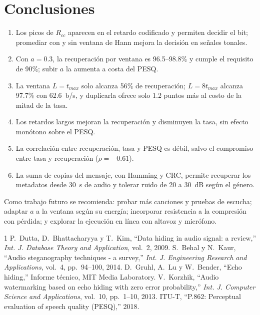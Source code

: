 \documentclass[journal]{IEEEtran}
\begin{document}
\section{Conclusiones}
\begin{enumerate}
\item Los picos de $R_{cc}$ aparecen en el retardo codificado y permiten decidir el bit; promediar con y sin ventana de Hann mejora la decisión en señales tonales.
\item Con $a=0.3$, la recuperación por ventana es 96.5--98.8\% y cumple el requisito de 90\%; subir $a$ la aumenta a costa del PESQ.
\item La ventana $L=t_{max}$ solo alcanza 56\% de recuperación; $L=8t_{max}$ alcanza 97.7\% con 62.6~b/s, y duplicarla ofrece solo 1.2 puntos más al costo de la mitad de la tasa.
\item Los retardos largos mejoran la recuperación y disminuyen la tasa, sin efecto monótono sobre el PESQ.
\item La correlación entre recuperación, tasa y PESQ es débil, salvo el compromiso entre tasa y recuperación ($\rho=-0.61$).
\item La suma de copias del mensaje, con Hamming y CRC, permite recuperar los metadatos desde 30~s de audio y tolerar ruido de 20 a 30~dB según el género.
\end{enumerate}
Como trabajo futuro se recomienda: probar más canciones y pruebas de escucha; adaptar $a$ a la ventana según su energía; incorporar resistencia a la compresión con pérdida; y explorar la ejecución en línea con altavoz y micrófono.

\begin{thebibliography}{1}
 P.~Dutta, D.~Bhattacharyya y T.~Kim, ``Data hiding in audio signal: a review,'' \textit{Int. J. Database Theory and Application}, vol.~2, 2009.
 S.~Behal y N.~Kaur, ``Audio steganography techniques - a survey,'' \textit{Int. J. Engineering Research and Applications}, vol.~4, pp.~94--100, 2014.
 D.~Gruhl, A.~Lu y W.~Bender, ``Echo hiding,'' Informe técnico, MIT Media Laboratory.
 V.~Korzhik, ``Audio watermarking based on echo hiding with zero error probability,'' \textit{Int. J. Computer Science and Applications}, vol.~10, pp.~1--10, 2013.
 ITU-T, ``P.862: Perceptual evaluation of speech quality (PESQ),'' 2018.
\end{thebibliography}
\end{document}
